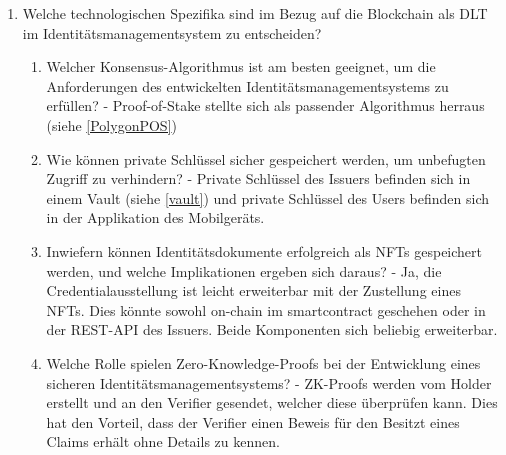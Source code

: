 \begin{enumerate}
\begin{enumerate}
	\end{enumerate}
	
	\item Welche technologischen Spezifika sind im Bezug auf die Blockchain als DLT im Identitätsmanagementsystem zu entscheiden?
	\begin{enumerate}
		\item Welcher Konsensus-Algorithmus ist am besten geeignet, um die Anforderungen des entwickelten Identitätsmanagementsystems zu erfüllen? - Proof-of-Stake stellte sich als passender Algorithmus herraus (siehe \ref{PolygonPOS})		
		\item Wie können private Schlüssel sicher gespeichert werden, um unbefugten Zugriff zu verhindern? - Private Schlüssel des Issuers befinden sich in einem Vault (siehe \ref{vault}) und private Schlüssel des Users befinden sich in der Applikation des Mobilgeräts.
		\item Inwiefern können Identitätsdokumente erfolgreich als NFTs gespeichert werden, und welche Implikationen ergeben sich daraus? - Ja, die Credentialausstellung ist leicht erweiterbar mit der Zustellung eines NFTs. Dies könnte sowohl on-chain im smartcontract geschehen oder in der REST-API des Issuers. Beide Komponenten sich beliebig erweiterbar.
		
		\item Welche Rolle spielen Zero-Knowledge-Proofs bei der Entwicklung eines sicheren Identitätsmanagementsystems? - ZK-Proofs werden vom Holder erstellt und an den Verifier gesendet, welcher diese überprüfen kann. Dies hat den Vorteil, dass der Verifier einen Beweis für den Besitzt eines Claims erhält ohne Details zu kennen.
	\end{enumerate}
\end{enumerate}

